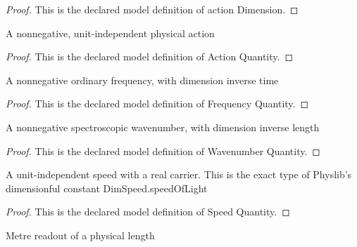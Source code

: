 \begin{proof}
  This is the declared model definition of action Dimension.
\end{proof}
\begin{definition}
  \label{def:physics:phyx-mini-0605:phyxminiproblems-problemphyxmini0605-actionquantity}
  A nonnegative, unit-independent physical action
\end{definition}
\begin{proof}
  This is the declared model definition of Action Quantity.
\end{proof}
\begin{definition}
  \label{def:physics:phyx-mini-0605:phyxminiproblems-problemphyxmini0605-frequencyquantity}
  A nonnegative ordinary frequency, with dimension inverse time
\end{definition}
\begin{proof}
  This is the declared model definition of Frequency Quantity.
\end{proof}
\begin{definition}
  \label{def:physics:phyx-mini-0605:phyxminiproblems-problemphyxmini0605-wavenumberquantity}
  A nonnegative spectroscopic wavenumber, with dimension inverse length
\end{definition}
\begin{proof}
  This is the declared model definition of Wavenumber Quantity.
\end{proof}
\begin{definition}
  \label{def:physics:phyx-mini-0605:phyxminiproblems-problemphyxmini0605-speedquantity}
  A unit-independent speed with a real carrier. This is the exact type of Physlib's dimensionful constant DimSpeed.speedOfLight
\end{definition}
\begin{proof}
  This is the declared model definition of Speed Quantity.
\end{proof}
\begin{definition}
  \label{def:physics:phyx-mini-0605:phyxminiproblems-problemphyxmini0605-lengthinmeters}
  Metre readout of a physical length
\end{definition}
